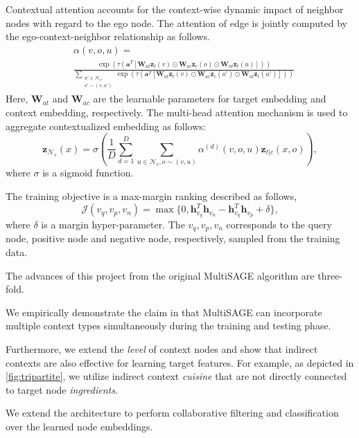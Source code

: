Contextual attention accounts for the context-wise dynamic impact of neighbor nodes with regard to the ego node. The attention of edge is jointly computed by the ego-context-neighbor relationship as follows.
\begin{equation}
\begin{split}
    & \alpha(v, o, u) = \\
    & \frac{\exp\left(\tau(\mathbf{a}^T[\mathbf{W}_{at}\mathbf{z}_t(v) \odot \mathbf{W}_{ac}\mathbf{z}_c(o) \odot \mathbf{W}_{at}\mathbf{z}_t(u)])\right)}{\sum\limits_{\substack{u' \in \mathcal{N}_v,\\o' \sim (v, u')}}\exp\left(\tau(\mathbf{a}^T[\mathbf{W}_{at}\mathbf{z}_t(v) \odot \mathbf{W}_{ac}\mathbf{z}_c(o') \odot \mathbf{W}_{at}\mathbf{z}_t(u')])\right)}
\end{split}
\end{equation}
Here, $\mathbf{W}_{at}$ and $\mathbf{W}_{ac}$ are the learnable parameters for target embedding and context embedding, respectively. The multi-head attention mechanism is used to aggregate contextualized embedding as follows:
\begin{equation}
    \mathbf{z}_{\mathcal{N}_v}(x) = \sigma \left( \frac{1}{D} \sum_{d=1}^{D} \sum_{u \in \mathcal{N}_v, o \sim (v, u)} \alpha^{(d)}(v, o, u) \mathbf{z}_{t|c}(x, o) \right),
\end{equation}
where $\sigma$ is a sigmoid function.

The training objective is a max-margin ranking described as follows,
\begin{equation}
    \mathcal{J}(v_q, v_p, v_n) = \max\{ 0, \mathbf{h}_{v_q}^T \mathbf{h}_{v_n} - \mathbf{h}_{v_q}^T \mathbf{h}_{v_p} + \delta \},
\end{equation}
where $\delta$ is a margin hyper-parameter. The $v_q, v_p, v_n$ corresponds to the query node, positive node and negative node, respectively, sampled from the training data.

The advances of this project from the original MultiSAGE algorithm are three-fold.
\bit
    \item We empirically demonstrate the claim in \cite{yang2020multisage} that MultiSAGE can incorporate multiple context types simultaneously during the training and testing phase.
    \item Furthermore, we extend the \emph{level} of context nodes and show that indirect contexts are also effective for learning target features. For example, as depicted in \ref{fig:tripartite}, we utilize indirect context \textit{cuisine} that are not directly connected to target node \textit{ingredients}.
    \item We extend the architecture to perform collaborative filtering and classification over the learned node embeddings.
\eit

